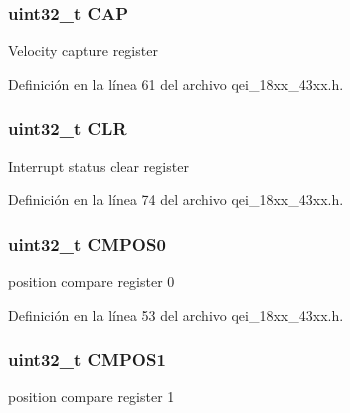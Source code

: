 \subsubsection[{\texorpdfstring{C\+AP}{CAP}}]{ uint32\+\_\+t C\+AP}\hypertarget{struct_l_p_c___q_e_i___t_a2728cd6e5817bd3c87b0bdecab2366ca}{}\label{struct_l_p_c___q_e_i___t_a2728cd6e5817bd3c87b0bdecab2366ca}
Velocity capture register 

Definición en la línea 61 del archivo qei\+\_\+18xx\+\_\+43xx.\+h.

\subsubsection[{\texorpdfstring{C\+LR}{CLR}}]{ uint32\+\_\+t C\+LR}\hypertarget{struct_l_p_c___q_e_i___t_a655b86dd7ae73a3e7deb3ba42078f0a8}{}\label{struct_l_p_c___q_e_i___t_a655b86dd7ae73a3e7deb3ba42078f0a8}
Interrupt status clear register 

Definición en la línea 74 del archivo qei\+\_\+18xx\+\_\+43xx.\+h.

\subsubsection[{\texorpdfstring{C\+M\+P\+O\+S0}{CMPOS0}}]{ uint32\+\_\+t C\+M\+P\+O\+S0}\hypertarget{struct_l_p_c___q_e_i___t_a7217ba8693f2641760f2d4404c854e04}{}\label{struct_l_p_c___q_e_i___t_a7217ba8693f2641760f2d4404c854e04}
position compare register 0 

Definición en la línea 53 del archivo qei\+\_\+18xx\+\_\+43xx.\+h.

\subsubsection[{\texorpdfstring{C\+M\+P\+O\+S1}{CMPOS1}}]{ uint32\+\_\+t C\+M\+P\+O\+S1}\hypertarget{struct_l_p_c___q_e_i___t_ad6681721dc510a40cadb8649e377a0ae}{}\label{struct_l_p_c___q_e_i___t_ad6681721dc510a40cadb8649e377a0ae}
position compare register 1 

